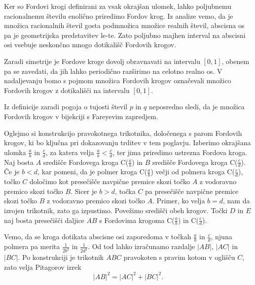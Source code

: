 \documentclass[mat1]{fmfdelo}
\begin{document}
Ker so Fordovi krogi definirani za vsak okrajšan ulomek, lahko poljubnemu racionalnemu številu enolično priredimo Fordov krog. Iz analize vemo, da je množica racionalnih števil gosta podmnožica množice realnih števil, abscisna os pa je geometrijska predstavitev le-te. Zato poljubno majhen interval na abscisni osi vsebuje neskončno mnogo dotikališč Fordovih krogov.

Zaradi simetrije je Fordove kroge dovolj obravnavati na intervalu $[0,1]$, obenem pa se zavedati, da jih lahko periodično razširimo na celotno realno os. V nadaljevanju bomo s pojmom množica Fordovih krogov označevali množico Fordovih krogov z dotikališči na intervalu $[0,1]$.

\begin{opomba}
Iz definicije zaradi pogoja o tujosti števil $p$ in $q$ neposredno sledi, da je množica Fordovih krogov v bijekciji s Fareyevim zapredjem.
\end{opomba}

Oglejmo si konstrukcijo pravokotnega trikotnika, določenega s parom Fordovih krogov, ki bo ključna pri dokazovanju trditev v tem poglavju. Izberimo okrajšana ulomka $\frac{a}{b}$ in $\frac{c}{d}$, za katera velja $\frac{a}{b} < \frac{c}{d}$, ter jima priredimo ustrezna Fordova kroga. Naj bosta $A$ središče Fordovega kroga C($\frac{a}{b}$) in $B$ središče Fordovega kroga C($\frac{c}{d}$). Če je $b<d$, kar pomeni, da je polmer kroga C($\frac{a}{b}$) večji od polmera kroga C($\frac{c}{d}$), točko $C$ določimo kot presečišče navpične premice skozi točko $A$ z vodoravno premico skozi točko $B$. Sicer je $b>d$, točka $C$ pa presečišče navpične premice skozi točko $B$ z vodoravno premico skozi točko $A$. Primer, ko velja $b=d$, nam da izrojen trikotnik, zato ga izpustimo. Povežimo središči obeh krogov. Točki $D$ in $E$ naj bosta presečišči daljice $AB$ s Fordovima krogoma C($\frac{a}{b}$) in C($\frac{c}{d}$).

Vemo, da se kroga dotikata abscisne osi zaporedoma v točkah $\frac{a}{b}$ in $\frac{c}{d}$, njuna polmera pa merita $\frac{1}{2b^2}$ in $\frac{1}{2d^2}$. Od tod lahko izračunamo razdalje $|AB|$, $|AC|$ in $|BC|$.
Po konstrukciji je trikotnik $ABC$ pravokoten s pravim kotom v oglišču $C$, zato velja Pitagorov izrek
\begin{equation}
\label{Eq:Pitagora}
|AB|^2 = |AC|^2 + |BC|^2. 
\end{equation}
\end{document}

